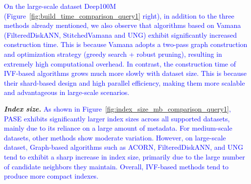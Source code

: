 \documentclass[sigconf, nonacm]{acmart}
\begin{document}
{\textcolor{blue}{On the large-scale dataset Deep100M (Figure~\ref{fig:build_time_comparison_query1} right), in addition to the three methods already mentioned, we also observe that algorithms based on Vamana (FilteredDiskANN, StitchedVamana and UNG) exhibit significantly increased construction time. This is because Vamana adopts a two-pass graph construction and optimization strategy (greedy search + robust pruning), resulting in extremely high computational overhead. In contrast, the construction time of IVF-based algorithms grows much more slowly with dataset size. This is because their shard-based design and high parallel efficiency, making them more scalable and advantageous in large-scale scenarios.}


%
%
%


\textit{\textbf{Index size.}}
\textcolor{blue}{
	As shown in Figure~\ref{fig:index_size_mb_comparison_query1}, PASE exhibits significantly larger index sizes across all supported datasets, mainly due to its reliance on a large amount of metadata. For medium-scale datasets, other methods show moderate variation. However, on large-scale dataset, Graph-based algorithms such as ACORN, FilteredDiskANN, and UNG tend to exhibit a sharp increase in index size, primarily due to the large number of candidate neighbors they maintain. Overall, IVF-based methods tend to produce more compact indexes.
}

}
\end{document}
